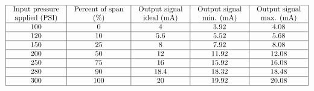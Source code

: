 






$$\vbox{\offinterlineskip
\halign{\strut
\vrule \quad\hfil # \ \hfil & 
\vrule \quad\hfil # \ \hfil & 
\vrule \quad\hfil # \ \hfil & 
\vrule \quad\hfil # \ \hfil & 
\vrule \quad\hfil # \ \hfil \vrule \cr
\noalign{\hrule}
%
Input pressure & Percent of span & Output signal & Output signal & Output signal \cr
%
applied (PSI) & (\%) & ideal (mA) & min. (mA) & max. (mA) \cr
%
\noalign{\hrule}
%
100 & 0 & 4 & 3.92 & 4.08 \cr
%
\noalign{\hrule}
%
120 & 10 & 5.6 & 5.52 & 5.68 \cr
%
\noalign{\hrule}
%
150 & 25 & 8 & 7.92 & 8.08 \cr
%
\noalign{\hrule}
%
200 & 50 & 12 & 11.92 & 12.08 \cr
%
\noalign{\hrule}
%
250 & 75 & 16 & 15.92 & 16.08 \cr
%
\noalign{\hrule}
%
280 & 90 & 18.4 & 18.32 & 18.48 \cr
%
\noalign{\hrule}
%
300 & 100 & 20 & 19.92 & 20.08 \cr
%
\noalign{\hrule}
} %
}$$ %




